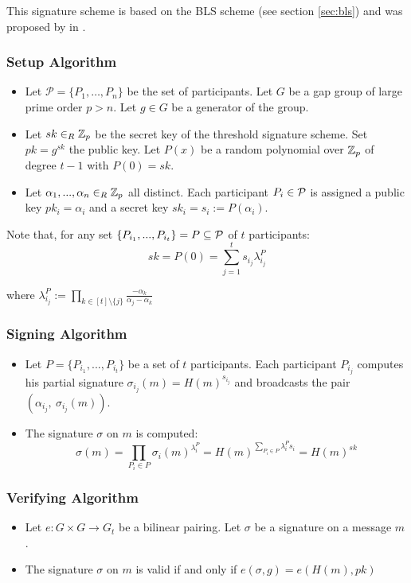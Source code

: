 This signature scheme is based on the BLS scheme (see section \ref{sec:bls}) and was proposed by \citeauthor{Boldyreva03} in \cite{Boldyreva03}.

\subsubsection*{Setup Algorithm}

\begin{itemize}[align = left, leftmargin=*, label={--}]
\item Let $\mathcal{P}= \{ P_1, \dots , P_n \}$ be the set of participants. Let $G$ be a gap group of large prime order $p > n$. Let $g \in G$ be a generator of the group.

\item Let $sk \in_R {\mathbb Z}_p$ be the secret key of the threshold signature scheme. Set $pk = g^{sk}$ the public key. Let $P(x)$ be a random polynomial over ${\mathbb Z}_p$ of degree $t-1$ with $P(0) = sk$.

\item Let $\alpha_1, ..., \alpha_n \in_R {\mathbb Z}_p$ all distinct. Each participant $P_i \in {\mathcal P}$ is assigned a public key $pk_i = \alpha_i$ and a secret key $sk_i = s_i := P(\alpha_i)$.

\end{itemize}

Note that, for any set $\{P_{i_1}, ... , P_{i_t} \} = P \subseteq {\mathcal P}$ of $t$ participants: $$sk = P(0) = \sum_{j = 1}^t s_{i_j} \lambda_{i_j}^P$$

where $\lambda_{i_j}^P := \prod_{k \in [t] \setminus \{j\}} \frac{-\alpha_k}{\alpha_j - \alpha_k}$

\subsubsection*{Signing Algorithm}
\begin{itemize}[align = left, leftmargin=*, label={--}]

\item Let $P = \{P_{i_1}, ..., P_{i_t} \}$ be a set of $t$ participants. Each participant $P_{i_j}$ computes his partial signature $\sigma_{i_j} (m) = H(m)^{s_{i_j}}$ and broadcasts the pair $(\alpha_{i_j}, \ \sigma_{i_j} (m))$.

\item The signature $\sigma$ on $m$ is computed: $$ \sigma (m) = \prod_{P_i \in P} \sigma_i (m)^{\lambda_i^{P}}= H(m)^{\sum_{P_i \in P} \lambda_i^P s_i} = H(m)^{sk}$$
\end{itemize}

\subsubsection*{Verifying Algorithm}
\begin{itemize}[align = left, leftmargin=*, label={--}]
\item Let $e: G \times G \rightarrow G_t$ be a bilinear pairing. Let $\sigma$ be a signature on a message $m$.
\item The signature $\sigma$ on $m$ is valid if and only if $e(\sigma, g) = e(H(m), pk)$
\end{itemize}